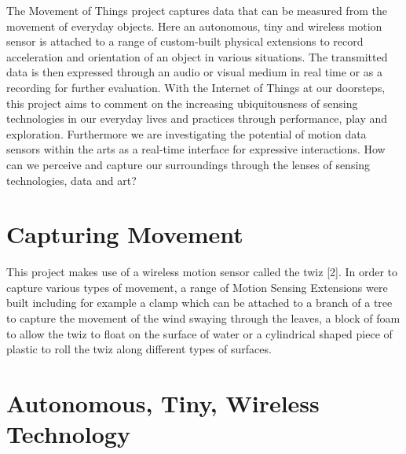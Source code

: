 \documentclass{sigchi}
\begin{document}
The Movement of Things project captures data that can
be measured from the movement of everyday objects.
Here an autonomous, tiny and wireless motion sensor
is attached to a range of custom-built physical
extensions to record acceleration and orientation of an
object in various situations. The transmitted data is
then expressed through an audio or visual medium in
real time or as a recording for further evaluation. With
the Internet of Things at our doorsteps, this project
aims to comment on the increasing ubiquitousness of
sensing technologies in our everyday lives and practices
through performance, play and exploration.
Furthermore we are investigating the potential of
motion data sensors within the arts as a real-time
interface for expressive interactions. How can we
perceive and capture our surroundings through the
lenses of sensing technologies, data and art?

\section{Capturing Movement}

This project makes use of a wireless motion sensor
called the twiz [2]. In order to capture various types of
movement, a range of Motion Sensing Extensions were
built including for example a clamp which can be
attached to a branch of a tree to capture the movement
of the wind swaying through the leaves, a block of
foam to allow the twiz to float on the surface of water
or a cylindrical shaped piece of plastic to roll the twiz
along different types of surfaces.

\section{Autonomous, Tiny, Wireless Technology}
\end{document}
